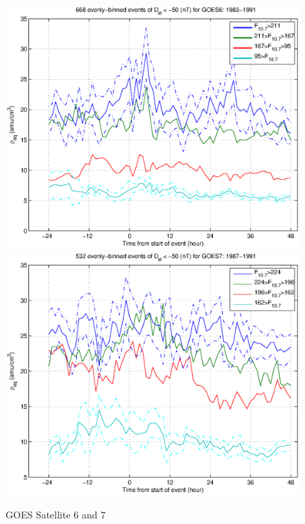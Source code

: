 \documentclass[10pt,twocolumn]{article}
\begin{document}
\begin{figure}[htp!]
\includegraphics[scale=0.45]{paperfigures/HighLowF107rhoeq-Dst50-GOES6-1983-1991.eps}
\includegraphics[scale=0.45]{paperfigures/HighLowF107rhoeq-Dst50-GOES7-1987-1991.eps}
\caption{GOES Satellite 6 and 7}
\label{GOES67}
\end{figure}
\end{document}

